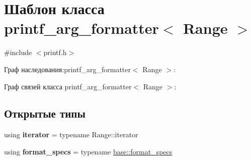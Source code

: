 \hypertarget{classprintf__arg__formatter}{}\section{Шаблон класса printf\+\_\+arg\+\_\+formatter$<$ Range $>$}
\label{classprintf__arg__formatter}


{\ttfamily \#include $<$printf.\+h$>$}



Граф наследования\+:printf\+\_\+arg\+\_\+formatter$<$ Range $>$\+:


Граф связей класса printf\+\_\+arg\+\_\+formatter$<$ Range $>$\+:
\subsection*{Открытые типы}
\begin{DoxyCompactItemize}
\item 
\mbox{\label{classprintf__arg__formatter_a9cf7de976f56df47b17b1216e184e159}} 
using {\bfseries iterator} = typename Range\+::iterator
\item 
\mbox{\label{classprintf__arg__formatter_a3d2fec4a57cd2611cf9b9478ac442e55}} 
using {\bfseries format\+\_\+specs} = typename \hyperlink{structbasic__format__specs}{base\+::format\+\_\+specs}
\end{DoxyCompactItemize}

